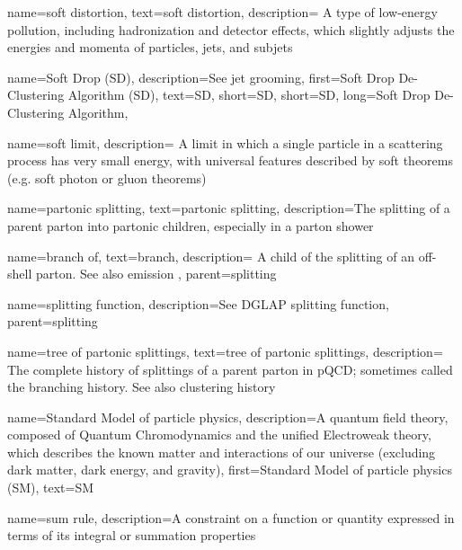 {
  name=soft distortion,
  text=soft distortion,
  description={
        A type of low-energy pollution, including hadronization and detector effects, which slightly adjusts the energies and momenta of particles, jets, and subjets
  }
}

{
    name=Soft Drop (SD),
    description={See jet grooming},
    first={Soft Drop De-Clustering Algorithm (SD)},
    text={SD},
    short={SD},
    short={SD},
    long={Soft Drop De-Clustering Algorithm},
}


{
    name=soft limit,
    description={
        A limit in which a single particle in a scattering process has very small energy, with universal features described by soft theorems (e.g. soft photon or gluon theorems)
    }
}

{
  name=partonic splitting,
  text=partonic splitting,
  description={The splitting of a parent parton into partonic children, especially in a parton shower}
}

    {
      name=branch of,
      text=branch,
      description={
          A child of the splitting of an off-shell parton.
          See also emission
      },
      parent=splitting
    }


    {
      name=splitting function,
      description={See DGLAP splitting function},
      parent=splitting
    }

    {
      name=tree of partonic splittings,
      text=tree of partonic splittings,
      description={
          The complete history of splittings of a parent parton in pQCD;
          sometimes called the branching history.
          See also clustering history
      }
    }





{
  name=Standard Model of particle physics,
  description={A quantum field theory, composed of Quantum Chromodynamics and the unified Electroweak theory, which describes the known matter and interactions of our universe (excluding dark matter, dark energy, and gravity)},
  first=Standard Model of particle physics (SM),
  text=SM
}

{
  name=sum rule,
  description={A constraint on a function or quantity expressed in terms of its integral or summation properties}
}


